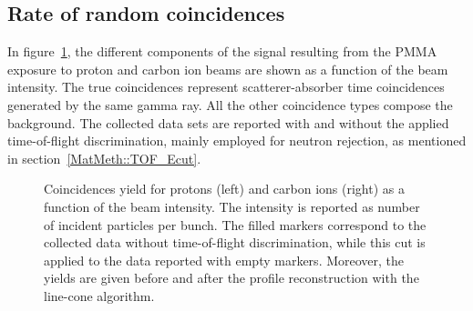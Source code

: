 \subsection{Rate of random coincidences}
\label{Results::beamInt}
 
In figure~\ref{fig:coincidences}, the different components of the signal resulting from the PMMA exposure to proton and carbon ion beams are shown as a function of the beam intensity. The true coincidences represent scatterer-absorber time coincidences generated by the same gamma ray. All the other coincidence types compose the background. The collected data sets are reported with and without the applied time-of-flight discrimination, mainly employed for neutron rejection, as mentioned in section~\ref{MatMeth::TOF_Ecut}.


\begin{figure} [!h]
  \caption{Coincidences yield for protons (left) and carbon ions (right) as a function of the beam intensity. The intensity is reported as number of incident particles per bunch. The filled markers correspond to the collected data without time-of-flight discrimination, while this cut is applied to the data reported with empty markers. Moreover, the yields are given before and after the profile reconstruction with the line-cone algorithm.}
  \label{fig:coincidences}
\end{figure}

